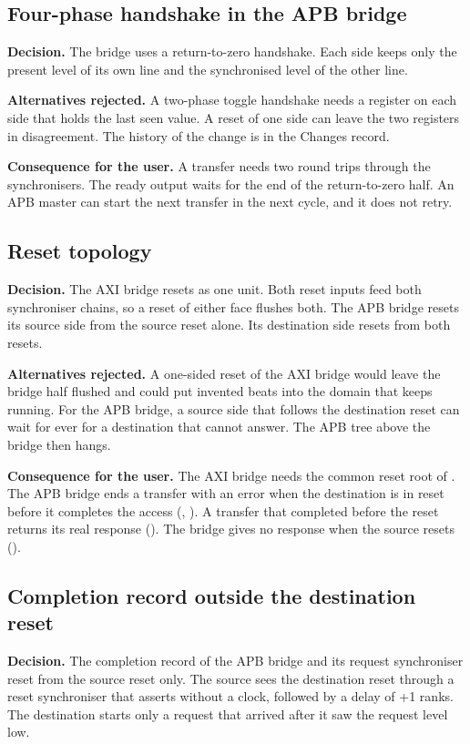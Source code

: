 \subsection{Four-phase handshake in the APB bridge}\label{ds:ch:mod-cdc-primitives:dec-rz}
\textbf{Decision.} The bridge uses a return-to-zero handshake. Each side keeps only the present level of its own line and the synchronised level of the other line.

\textbf{Alternatives rejected.} A two-phase toggle handshake needs a register on each side that holds the last seen value. A reset of one side can leave the two registers in disagreement. The history of the change is in the Changes record.

\textbf{Consequence for the user.} A transfer needs two round trips through the synchronisers. The ready output waits for the end of the return-to-zero half. An APB master can start the next transfer in the next cycle, and it does not retry.

\subsection{Reset topology}\label{ds:ch:mod-cdc-primitives:dec-reset}
\textbf{Decision.} The AXI bridge resets as one unit. Both reset inputs feed both synchroniser chains, so a reset of either face flushes both. The APB bridge resets its source side from the source reset alone. Its destination side resets from both resets.

\textbf{Alternatives rejected.} A one-sided reset of the AXI bridge would leave the bridge half flushed and could put invented beats into the domain that keeps running. For the APB bridge, a source side that follows the destination reset can wait for ever for a destination that cannot answer. The APB tree above the bridge then hangs.

\textbf{Consequence for the user.} The AXI bridge needs the common reset root of . The APB bridge ends a transfer with an error when the destination is in reset before it completes the access (, ). A transfer that completed before the reset returns its real response (). The bridge gives no response when the source resets ().

\subsection{Completion record outside the destination reset}\label{ds:ch:mod-cdc-primitives:dec-comp-record}
\textbf{Decision.} The completion record of the APB bridge and its request synchroniser reset from the source reset only. The source sees the destination reset through a reset synchroniser that asserts without a clock, followed by a delay of +1 ranks. The destination starts only a request that arrived after it saw the request level low.

